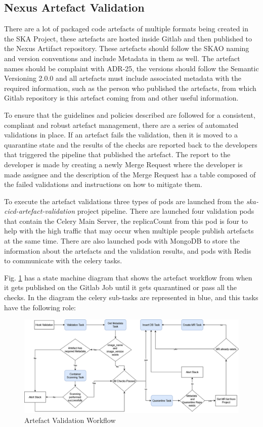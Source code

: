 \documentclass[a4paper,
               keeplastbox,   %
               ]{jacow}
\begin{document}
\subsection{Nexus Artefact Validation}

There are a lot of packaged code artefacts of multiple formats being created in the SKA Project, these artefacts are hosted inside Gitlab and then published to the Nexus Artifact repository. These artefacts should follow the SKAO naming and version conventions and include Metadata in them as well. The artefact names should be complaint with ADR-25, the versions should follow the Semantic Versioning 2.0.0 and all artefacts must include associated metadata with the required information, such as the person who published the artefacts, from which Gitlab repository is this artefact coming from and other useful information.

To ensure that the guidelines and policies described are followed for a consistent, compliant and robust artefact management, there are a series of automated validations in place. If an artefact fails the validation, then it is moved to a quarantine state and the results of the checks are reported back to the developers that triggered the pipeline that published the artefact. The report to the developer is made by creating a newly Merge Request where the developer is made assignee and the description of the Merge Request has a table composed of the failed validations and instructions on how to mitigate them.

To execute the artefact validations three types of pods are launched from the \textit{ska-cicd-artefact-validation} project pipeline. There are launched four validation pods that contain the Celery Main Server, the replicaCount from this pod is four to help with the high traffic that may occur when multiple people publish artefacts at the same time. There are also launched pods with MongoDB to store the information about the artefacts and the validation results, and pods with Redis to communicate with the celery tasks.

Fig. \ref{fig:Artefact-Validation-Workflow} has a state machine diagram that shows the artefact workflow from when it gets published on the Gitlab Job until it gets quarantined or pass all the checks. In the diagram the celery sub-tasks are represented in blue, and this tasks have the following role:

\begin{figure}[!htb]
    \centering
    \includegraphics*[width=0.8\columnwidth]{Artefact-Validation-Workflow}
    \caption{Artefact Validation Workflow}
    \label{fig:Artefact-Validation-Workflow}
 \end{figure}
\end{document}
